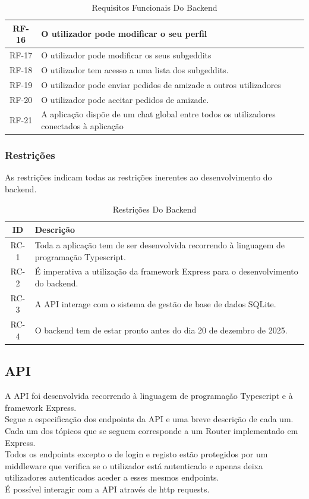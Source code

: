 \documentclass{article}
\begin{document}
\begin{table}[H]
\begin{tabular}{|c|p{14cm}|}
				\hline
				RF-16 & O utilizador pode modificar o seu perfil \\
				\hline
				RF-17 & O utilizador pode modificar os seus subgeddits \\
				\hline
				RF-18 & O utilizador tem acesso a uma lista dos subgeddits. \\
				\hline
				RF-19 & O utilizador pode enviar pedidos de amizade a outros utilizadores \\
				\hline
				RF-20 & O utilizador pode aceitar pedidos de amizade. \\
				\hline
				RF-21 & A aplicação dispõe de um chat global entre todos os utilizadores conectados à aplicação \\
				\hline
			\end{tabular}
			\caption{Requisitos Funcionais Do Backend}
		\end{table}
		\subsubsection{Restrições}
		As restrições indicam todas as restrições inerentes ao desenvolvimento do backend.
		\begin{table}[H]
			\centering
			\begin{tabular}{|c|p{14cm}|}
				\hline
				ID & Descrição \\
				\hline
				RC-1 & Toda a aplicação tem de ser desenvolvida recorrendo à linguagem de programação Typescript. \\
				\hline
				RC-2 & É imperativa a utilização da framework Express para o desenvolvimento do backend. \\
				\hline
				RC-3 & A API interage com o sistema de gestão de base de dados SQLite. \\
				\hline
				RC-4 & O backend tem de estar pronto antes do dia 20 de dezembro de 2025. \\
				\hline
			\end{tabular}
			\caption{Restrições Do Backend}
		\end{table}
	\subsection{API}
	A API foi desenvolvida recorrendo à linguagem de programação Typescript e à framework Express. \\
	Segue a especificação dos endpoints da API e uma breve descrição de cada um. \\
	Cada um dos tópicos que se seguem corresponde a um Router implementado em Express. \\
	Todos os endpoints excepto o de login e registo estão protegidos por um middleware que verifica se o utilizador está autenticado e apenas deixa utilizadores autenticados aceder a esses mesmos endpoints. \\
	É possível interagir com a API através de http requests. \\
\end{document}
